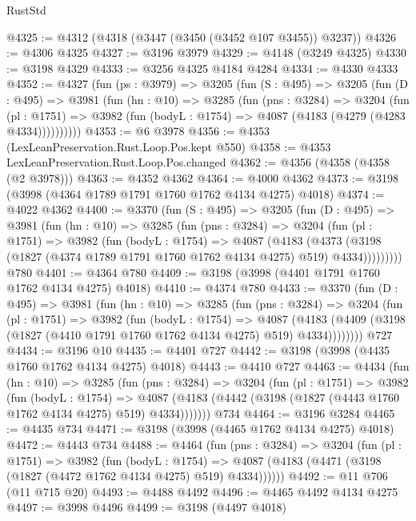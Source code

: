 \begin{lexlean}{RustStd}
\begin{coremodule}
@4325 := @4312 (@4318 (@3447 (@3450 (@3452 @107 @3455)) @3237))
@4326 := @4306 @4325
@4327 := @3196 @3979
@4329 := @4148 (@3249 @4325)
@4330 := @3198 @4329
@4333 := @3256 @4325 @4184 @4284
@4334 := @4330 @4333
@4352 := @4327
    (fun (ps : @3979) =>
    @3205
      (fun (S : @495) =>
      @3205
        (fun (D : @495) =>
        @3981
          (fun (hn : @10) =>
          @3285
            (fun (pns : @3284) =>
            @3204
              (fun (pl : @1751) =>
              @3982 (fun (bodyL : @1754) => @4087 (@4183 (@4279 (@4283 @4334))))))))))
@4353 := @6 @3978
@4356 := @4353 (LexLeanPreservation.Rust.Loop.Pos.kept @550)
@4358 := @4353 LexLeanPreservation.Rust.Loop.Pos.changed
@4362 := @4356 (@4358 (@4358 (@2 @3978)))
@4363 := @4352 @4362
@4364 := @4000 @4362
@4373 := @3198 (@3998 (@4364 @1789 @1791 @1760 @1762 @4134 @4275) @4018)
@4374 := @4022 @4362
@4400 := @3370
    (fun (S : @495) =>
    @3205
      (fun (D : @495) =>
      @3981
        (fun (hn : @10) =>
        @3285
          (fun (pns : @3284) =>
          @3204
            (fun (pl : @1751) =>
            @3982
              (fun (bodyL : @1754) =>
              @4087
                (@4183
                  (@4373
                    (@3198 (@1827 (@4374 @1789 @1791 @1760 @1762 @4134 @4275) @519) @4334)))))))))
    @780
@4401 := @4364 @780
@4409 := @3198 (@3998 (@4401 @1791 @1760 @1762 @4134 @4275) @4018)
@4410 := @4374 @780
@4433 := @3370
    (fun (D : @495) =>
    @3981
      (fun (hn : @10) =>
      @3285
        (fun (pns : @3284) =>
        @3204
          (fun (pl : @1751) =>
          @3982
            (fun (bodyL : @1754) =>
            @4087
              (@4183 (@4409 (@3198 (@1827 (@4410 @1791 @1760 @1762 @4134 @4275) @519) @4334))))))))
    @727
@4434 := @3196 @10
@4435 := @4401 @727
@4442 := @3198 (@3998 (@4435 @1760 @1762 @4134 @4275) @4018)
@4443 := @4410 @727
@4463 := @4434
    (fun (hn : @10) =>
    @3285
      (fun (pns : @3284) =>
      @3204
        (fun (pl : @1751) =>
        @3982
          (fun (bodyL : @1754) =>
          @4087 (@4183 (@4442 (@3198 (@1827 (@4443 @1760 @1762 @4134 @4275) @519) @4334)))))))
    @734
@4464 := @3196 @3284
@4465 := @4435 @734
@4471 := @3198 (@3998 (@4465 @1762 @4134 @4275) @4018)
@4472 := @4443 @734
@4488 := @4464
    (fun (pns : @3284) =>
    @3204
      (fun (pl : @1751) =>
      @3982
        (fun (bodyL : @1754) =>
        @4087 (@4183 (@4471 (@3198 (@1827 (@4472 @1762 @4134 @4275) @519) @4334))))))
@4492 := @11 @706 (@11 @715 @20)
@4493 := @4488 @4492
@4496 := @4465 @4492 @4134 @4275
@4497 := @3998 @4496
@4499 := @3198 (@4497 @4018)

\end{coremodule}
\end{lexlean}
